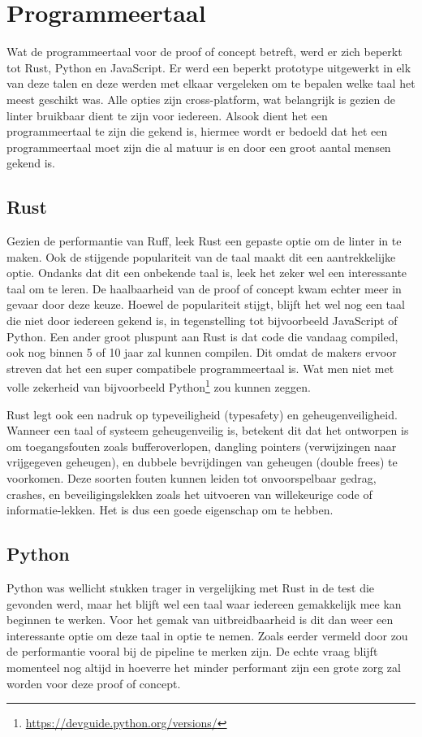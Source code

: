 \section{Programmeertaal}
Wat de programmeertaal voor de proof of concept betreft, werd er zich beperkt tot Rust, Python en JavaScript. Er werd een beperkt prototype uitgewerkt in elk van deze talen en deze werden met elkaar vergeleken om te bepalen welke taal het meest geschikt was. Alle opties zijn cross-platform, wat belangrijk is gezien de linter bruikbaar dient te zijn voor iedereen. Alsook dient het een programmeertaal te zijn die gekend is, hiermee wordt er bedoeld dat het een programmeertaal moet zijn die al matuur is en door een groot aantal mensen gekend is.

\subsection{Rust}
Gezien de performantie van Ruff, leek Rust een gepaste optie om de linter in te maken. Ook de stijgende populariteit van de taal maakt dit een aantrekkelijke optie. Ondanks dat dit een onbekende taal is, leek het zeker wel een interessante taal om te leren. De haalbaarheid van de proof of concept kwam echter meer in gevaar door deze keuze. Hoewel de populariteit stijgt, blijft het wel nog een taal die niet door iedereen gekend is, in tegenstelling tot bijvoorbeeld JavaScript of Python. Een ander groot pluspunt aan Rust is dat code die vandaag compiled, ook nog binnen 5 of 10 jaar zal kunnen compilen. Dit omdat de makers ervoor streven dat het een super compatibele programmeertaal is. Wat men niet met volle zekerheid van bijvoorbeeld Python\footnote{\url{https://devguide.python.org/versions/}} zou kunnen zeggen. 
 
Rust legt ook een nadruk op typeveiligheid (typesafety) en geheugenveiligheid. Wanneer een taal of systeem geheugenveilig is, betekent dit dat het ontworpen is om toegangsfouten zoals bufferoverlopen, dangling pointers (verwijzingen naar vrijgegeven geheugen), en dubbele bevrijdingen van geheugen (double frees) te voorkomen. Deze soorten fouten kunnen leiden tot onvoorspelbaar gedrag, crashes, en beveiligingslekken zoals het uitvoeren van willekeurige code of informatie-lekken. Het is dus een goede eigenschap om te hebben.\autocite{Klabnik2022}

\subsection{Python}
Python was wellicht stukken trager in vergelijking met Rust in de test die gevonden werd, maar het blijft wel een taal waar iedereen gemakkelijk mee kan beginnen te werken. Voor het gemak van uitbreidbaarheid is dit dan weer een interessante optie om deze taal in optie te nemen. Zoals eerder vermeld door \textcite{TurnerTrauring2023} zou de performantie vooral bij de pipeline te merken zijn.
De echte vraag blijft momenteel nog altijd in hoeverre het minder performant zijn een grote zorg zal worden voor deze proof of concept.

